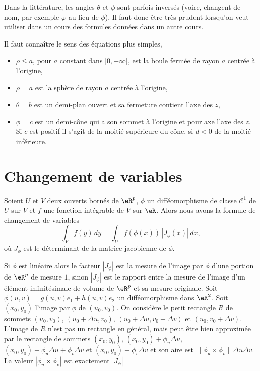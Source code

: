 \begin{remark}
	Dans la littérature, les angles $\theta$ et $\phi$ sont parfois inversés (voire, changent de nom, par exemple $\varphi$ au lieu de $\phi$). Il faut donc être très prudent lorsqu'on veut utiliser dans un cours des formules données dans un autre cours.
\end{remark}

\begin{example}
Il faut connaître le sens des équations plus simples, 
\begin{itemize}
\item $\rho\leq a$, pour $a$ constant dans  $]0, +\infty[$, est la boule fermée de rayon $a$ centrée à l'origine, 
\item $\rho= a$ est  la sphère de rayon $a$ centrée à l'origine,
\item $\theta = b$ est un demi-plan ouvert et sa fermeture contient l'axe des $z$,
\item $\phi= c$ est un demi-cône qui a  son sommet à l'origine et  pour axe l'axe des $z$.  Si $c$ est positif  il s'agit  de la moitié supérieure du cône, si $d<0$ de la moitié inférieure. 
\end{itemize}
 \end{example}

\section{Changement de variables}
\begin{theorem}		\label{ThoChmVarInt}
  Soient $U$ et $V$ deux ouverts bornés de $\eR^p$, $\phi$ un difféomorphisme de classe $\mathcal{C}^1$ de $U$ sur $V$ et $f$ une fonction intégrable de $V$ sur $\eR$. Alors nous avons la formule de changement de variables 
  \begin{equation}
    \int_{V}f(y)\, dy= \int_{U} f(\phi(x))\, \left| J_{\phi}(x)\right|\, dx,
  \end{equation}
  où $J_{\phi}$ est le déterminant de la matrice jacobienne de $\phi$. 
\end{theorem}
Si $\phi$ est linéaire  alors le facteur $|J_{\phi}|$ est la mesure de l'image par $\phi$ d'une portion de $\eR^p$ de mesure $1$, sinon  $|J_{\phi}|$ est le rapport entre la mesure de l'image d'un élément infinitésimale de volume de $\eR^p$ et sa mesure originale. 
Soit $\phi(u,v)=g(u,v)e_1+h(u,v)e_2$ un difféomorphisme dans $\eR^2$. Soit $(x_0, y_0)$ l'image par $\phi$ de $(u_0,v_0)$. On considère le petit rectangle $R$ de sommets $(u_0,v_0)$, $(u_0+\Delta u,v_0)$, $(u_0+\Delta u,v_0+\Delta v)$ et $(u_0,v_0+\Delta v)$. L'image de $R$ n'est pas un rectangle en général, mais peut être bien approximée par le rectangle de sommets $(x_0,y_0)$, $(x_0 ,y_0)+ \phi_{u}\Delta u$, $(x_0 ,y_0)+\phi_{u}\Delta u +\phi_{v}\Delta v$ et  $(x_0 ,y_0)+ \phi_{v}\Delta v$ et son aire est $\| \phi_{u}\times \phi_{v}\| \Delta u\Delta v$. La valeur $|\phi_{u}\times \phi_{v}|$ est exactement $|J_{\phi}|$ 

